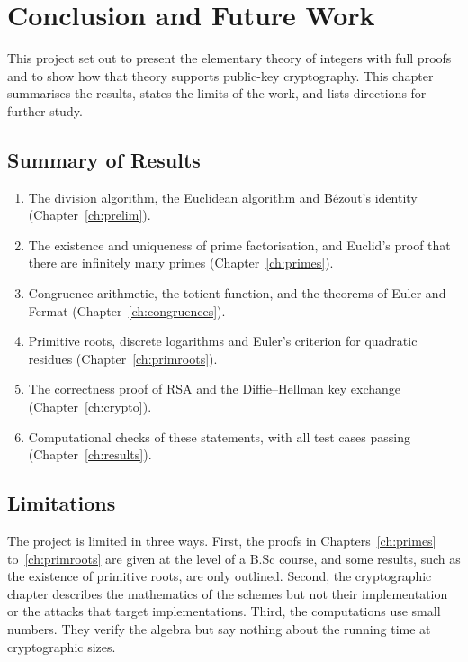 \chapter{Conclusion and Future Work}\label{ch:conclusion}

This project set out to present the elementary theory of integers with full proofs and to show how that theory supports public-key cryptography. This chapter summarises the results, states the limits of the work, and lists directions for further study.

\section{Summary of Results}

\begin{enumerate}
  \item The division algorithm, the Euclidean algorithm and Bézout's identity (Chapter~\ref{ch:prelim}).
  \item The existence and uniqueness of prime factorisation, and Euclid's proof that there are infinitely many primes (Chapter~\ref{ch:primes}).
  \item Congruence arithmetic, the totient function, and the theorems of Euler and Fermat (Chapter~\ref{ch:congruences}).
  \item Primitive roots, discrete logarithms and Euler's criterion for quadratic residues (Chapter~\ref{ch:primroots}).
  \item The correctness proof of RSA and the Diffie--Hellman key exchange (Chapter~\ref{ch:crypto}).
  \item Computational checks of these statements, with all test cases passing (Chapter~\ref{ch:results}).
\end{enumerate}

\section{Limitations}

The project is limited in three ways. First, the proofs in Chapters~\ref{ch:primes} to~\ref{ch:primroots} are given at the level of a B.Sc course, and some results, such as the existence of primitive roots, are only outlined. Second, the cryptographic chapter describes the mathematics of the schemes but not their implementation or the attacks that target implementations. Third, the computations use small numbers. They verify the algebra but say nothing about the running time at cryptographic sizes.

